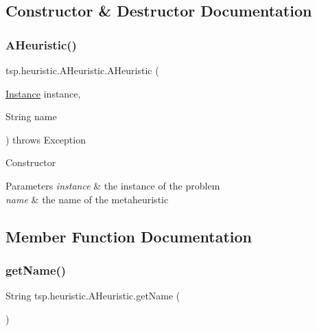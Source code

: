 \subsection{Constructor \& Destructor Documentation}
\mbox{\label{classtsp_1_1heuristic_1_1_a_heuristic_a7eacbf5e1305f1cdedc1fd2b9765f766}} 
\subsubsection{\texorpdfstring{A\+Heuristic()}{AHeuristic()}}
{\footnotesize\ttfamily tsp.\+heuristic.\+A\+Heuristic.\+A\+Heuristic (\begin{DoxyParamCaption}\item[{\mbox{\hyperlink{classtsp_1_1_instance}{Instance}}}]{instance,  }\item[{String}]{name }\end{DoxyParamCaption}) throws Exception\hspace{0.3cm}{\ttfamily [inline]}}

Constructor 
\begin{DoxyParams}{Parameters}
{\em instance} & the instance of the problem \\
\hline
{\em name} & the name of the metaheuristic \\
\hline
\end{DoxyParams}


\subsection{Member Function Documentation}
\mbox{\label{classtsp_1_1heuristic_1_1_a_heuristic_a8757a9661d1a3ca486cf8ceaa80d240a}} 
\subsubsection{\texorpdfstring{get\+Name()}{getName()}}
{\footnotesize\ttfamily String tsp.\+heuristic.\+A\+Heuristic.\+get\+Name (\begin{DoxyParamCaption}{ }\end{DoxyParamCaption})\hspace{0.3cm}{\ttfamily [inline]}}

